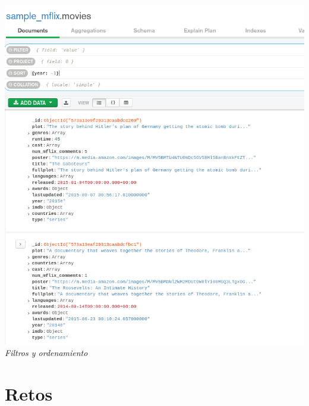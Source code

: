 \documentclass[10pt]{article}
\begin{document}
\begin{center}
  \includegraphics[scale=0.35]{imgs/ej2_5.png}\\
  \textit{Filtros y ordenamiento}
\end{center}
\clearpage
\section{Retos}
\end{document}
